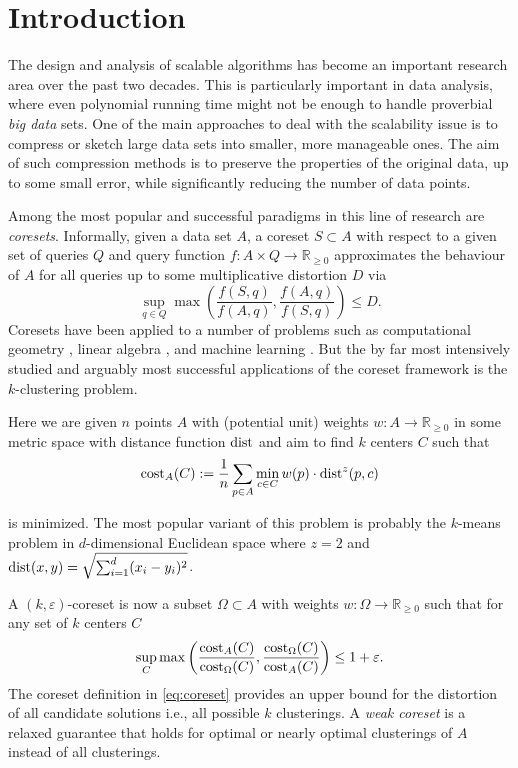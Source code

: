 \section{Introduction}

The design and analysis of scalable algorithms has become an important research area over the past two decades. This is particularly important in data analysis, where even polynomial running time might not be enough to handle proverbial \emph{big data} sets.
One of the main approaches to deal with the scalability issue is to compress or sketch large data sets into smaller, more manageable ones. The aim of such compression methods is to preserve the properties of the original data, up to some small error, while significantly reducing the number of data points.

Among the most popular and successful paradigms in this line of research are \emph{coresets}. Informally, given a data set $A$, a coreset $S\subset A$ with respect to a given set of queries $Q$ and query function $f: A\times Q \rightarrow \mathbb{R}_{\geq 0}$ approximates the behaviour of $A$ for all queries up to some multiplicative distortion $D$ via
$$ \sup_{q\in Q} \max\left( \frac{f(S,q)}{f(A,q)},\frac{f(A,q)}{f(S,q)}\right) \leq D.$$
Coresets have been applied to a number of problems such as computational geometry \cite{AHV05,Chan09}, linear algebra \cite{IndykMGR20,maalouf2019fast}, and machine learning \cite{MRM21,MunteanuSSW18}. But the by far most intensively studied and arguably most successful applications of the coreset framework is the $k$-clustering problem.

Here we are given $n$ points $A$ with (potential unit) weights $w:A\rightarrow \mathbb{R}_{\geq 0}$ in some metric space with distance function $\text{dist}$ and aim to find $k$ centers $C$ such that $$\text{cost}_A(C):= \frac{1}{n} \sum_{p\in A}  \min_{c\in C} w(p)\cdot \text{dist}^z(p,c)$$

is minimized. The most popular variant of this problem is probably the $k$-means problem in $d$-dimensional Euclidean space where $z=2$ and $\text{dist}(x,y) = \sqrt{\sum_{i=1}^d (x_i-y_i)^2}$.



A $(k,\varepsilon)$-coreset is now a subset $\Omega\subset A$ with weights $w:\Omega\rightarrow \mathbb{R}_{\geq 0}$ such that for any set of $k$ centers $C$
\begin{equation}
\label{eq:coreset}
\sup_{C} \max\left( \frac{\text{cost}_A(C)}{\text{cost}_{\Omega}(C)},\frac{\text{cost}_{\Omega}(C)}{\text{cost}_{A}(C)}\right) \leq 1+\varepsilon.
\end{equation}
The coreset definition in \cref{eq:coreset} provides an upper bound for the distortion of all candidate solutions i.e., all possible $k$ clusterings. 
A \emph{weak coreset} is a relaxed guarantee that holds for optimal or nearly optimal clusterings of $A$ instead of all clusterings.


